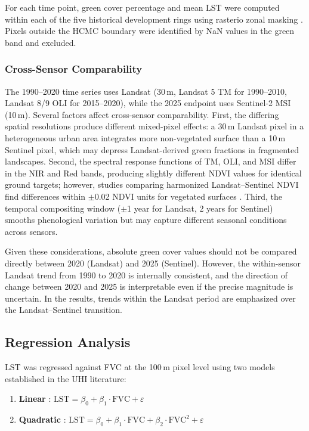 \documentclass[preprint,12pt]{elsarticle}
\begin{document}
For each time point, green cover percentage and mean LST were computed within each of the five historical development rings using rasterio zonal masking \citep{gillies2019}. Pixels outside the HCMC boundary were identified by NaN values in the green band and excluded.

\subsubsection{Cross-Sensor Comparability}

The 1990--2020 time series uses Landsat (30\,m, Landsat 5 TM for 1990--2010, Landsat 8/9 OLI for 2015--2020), while the 2025 endpoint uses Sentinel-2 MSI (10\,m). Several factors affect cross-sensor comparability. First, the differing spatial resolutions produce different mixed-pixel effects: a 30\,m Landsat pixel in a heterogeneous urban area integrates more non-vegetated surface than a 10\,m Sentinel pixel, which may depress Landsat-derived green fractions in fragmented landscapes. Second, the spectral response functions of TM, OLI, and MSI differ in the NIR and Red bands, producing slightly different NDVI values for identical ground targets; however, studies comparing harmonized Landsat--Sentinel NDVI find differences within $\pm$0.02 NDVI units for vegetated surfaces \citep{claverie2018}. Third, the temporal compositing window ($\pm$1 year for Landsat, 2 years for Sentinel) smooths phenological variation but may capture different seasonal conditions across sensors.

Given these considerations, absolute green cover values should not be compared directly between 2020 (Landsat) and 2025 (Sentinel). However, the within-sensor Landsat trend from 1990 to 2020 is internally consistent, and the direction of change between 2020 and 2025 is interpretable even if the precise magnitude is uncertain. In the results, trends within the Landsat period are emphasized over the Landsat--Sentinel transition.

\subsection{Regression Analysis}

LST was regressed against FVC at the 100\,m pixel level using two models established in the UHI literature:

\begin{enumerate}
    \item \textbf{Linear} \citep{weng2004}: $\text{LST} = \beta_0 + \beta_1 \cdot \text{FVC} + \varepsilon$
    \item \textbf{Quadratic} \citep{li2013}: $\text{LST} = \beta_0 + \beta_1 \cdot \text{FVC} + \beta_2 \cdot \text{FVC}^2 + \varepsilon$
\end{enumerate}
\end{document}
